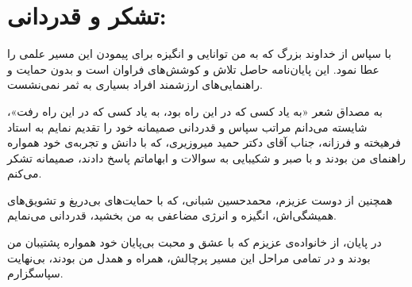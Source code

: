 \chapter*{\vspace{-2.38cm}\fontsize{15}{16}\selectfont تشکر و قدردانی:}

با سپاس از خداوند بزرگ که به من توانایی و انگیزه برای پیمودن این مسیر علمی را عطا نمود. این پایان‌نامه حاصل تلاش و کوشش‌های فراوان است و بدون حمایت و راهنمایی‌های ارزشمند افراد بسیاری به ثمر نمی‌نشست.

به مصداق شعر «به یاد کسی که در این راه بود، به یاد کسی که در این راه رفت»، شایسته می‌دانم مراتب سپاس و قدردانی صمیمانه خود را تقدیم نمایم به استاد فرهیخته و فرزانه، جناب آقای دکتر حمید میروزیری، که با دانش و تجربه‌ی خود همواره راهنمای من بودند و با صبر و شکیبایی به سوالات و ابهاماتم پاسخ دادند، صمیمانه تشکر می‌کنم.

همچنین از دوست عزیزم، محمدحسین شبانی، که با حمایت‌های بی‌دریغ و تشویق‌های همیشگی‌اش، انگیزه و انرژی مضاعفی به من بخشید، قدردانی می‌نمایم.

در پایان، از خانواده‌ی عزیزم که با عشق و محبت بی‌پایان خود همواره پشتیبان من بودند و در تمامی مراحل این مسیر پرچالش، همراه و همدل من بودند، بی‌نهایت سپاسگزارم.


